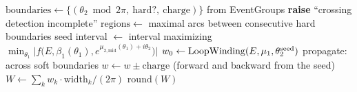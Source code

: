\begin{algorithm}
\caption{\textsc{ComputeAverageWinding}$(zm,\mathrm{poly},E,\mu_1,\mathrm{charges})$ —
average major-axis winding by regions, seed loops, and charge propagation.}
\label{alg:average-winding}
\begin{algorithmic}[1]
\State $\mathrm{boundaries}\gets\{(\theta_2\bmod2\pi,\ \mathrm{hard}?,\ \mathrm{charge})\}$ from EventGroups
   \State \textbf{raise} ``crossing detection incomplete''  \EndIf
\EndIf
\State $\mathrm{regions}\gets$ maximal arcs between consecutive hard boundaries
  \State seed interval $\gets$ interval maximizing $\min_{\theta_1}\big|f\big(E,\beta_1(\theta_1),e^{\mu_{2,\mathrm{mid}}(\theta_1)+i\theta_2}\big)\big|$
  \State $w_0\gets\mathrm{LoopWinding}(E,\mu_1,\theta_2^{\mathrm{seed}})$ 
  \State propagate: across soft boundaries $w\gets w\pm\mathrm{charge}$ (forward and backward from the seed)
\EndFor
\State $W\gets\sum_k w_k\cdot\mathrm{width}_k/(2\pi)$ 
\State \Return $\mathrm{round}(W)$
\end{algorithmic}
\end{algorithm}

